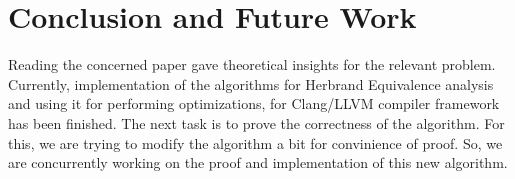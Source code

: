 \chapter{Conclusion and Future Work}

Reading the concerned paper gave theoretical insights for the relevant problem. 
Currently, implementation of the algorithms for Herbrand Equivalence analysis
and using it for performing optimizations, for Clang/LLVM compiler framework
has been finished. 
The next task is to prove the correctness of the algorithm. For this, we are 
trying to modify the algorithm a bit for convinience of proof. So, we are 
concurrently working on the proof and implementation of this new algorithm.
